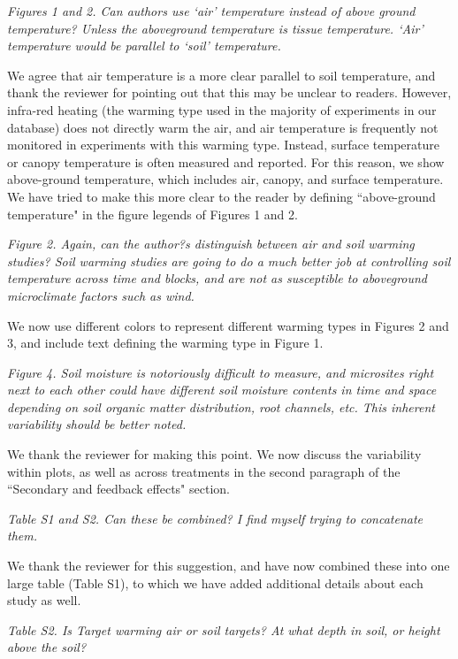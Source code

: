 \documentclass[11pt,a4paper]{letter}
\begin{document}
\begin{letter}{}
\par \emph{Figures 1 and 2. Can authors use `air' temperature instead of above ground temperature? Unless the aboveground temperature is tissue temperature.  `Air' temperature would be parallel to `soil' temperature. }
\par We agree that air temperature is a more clear parallel to soil temperature, and thank the reviewer for pointing out that this may be unclear to readers. However, infra-red heating (the warming type used in the majority of experiments in our database)  does not directly warm the air, and air temperature is frequently not monitored in experiments with this warming type. Instead, surface temperature or canopy temperature is often measured and reported. For this reason, we show above-ground temperature, which includes air, canopy, and surface temperature. We have tried to make this more clear to the reader by defining ``above-ground temperature" in the figure legends of Figures 1 and 2.

\par \emph{Figure 2.  Again, can the author?s distinguish between air and soil warming studies?  Soil warming studies are going to do a much better job at controlling soil temperature across time and blocks, and are not as susceptible to aboveground microclimate factors such as wind.}
\par We now use different colors to represent different warming types in Figures 2 and 3, and include text defining the warming type in Figure 1.

\par \emph{Figure 4.  Soil moisture is notoriously difficult to measure, and microsites right next to each other could have different soil moisture contents in time and space depending on soil organic matter distribution, root channels, etc.  This inherent variability should be better noted.}
\par We thank the reviewer for making this point. We now discuss the variability within plots, as well as across treatments in the second paragraph of the ``Secondary and feedback effects" section. 

\par \emph{Table S1 and S2.  Can these be combined?  I find myself trying to concatenate them.}
\par We thank the reviewer for this suggestion, and have now combined these into one large table (Table S1), to which we have added additional details about each study as well.

\par \emph{Table S2.  Is Target warming air or soil targets?  At what depth in soil, or height above the soil?}


\end{letter}
\end{document}
